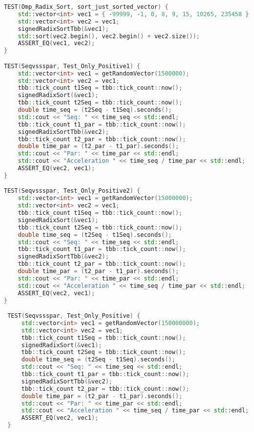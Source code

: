 \documentclass{report}
\begin{document}
\begin{lstlisting}[language=C++]
TEST(Omp_Radix_Sort, sort_just_sorted_vector) {
    std::vector<int> vec1 = { -99999, -1, 0, 8, 9, 15, 10265, 235458 };
    std::vector<int> vec2 = vec1;
    signedRadixSortTbb(&vec1);
    std::sort(vec2.begin(), vec2.begin() + vec2.size());
    ASSERT_EQ(vec1, vec2);
}

TEST(Seqvssspar, Test_Only_Positive1) {
    std::vector<int> vec1 = getRandomVector(1500000);
    std::vector<int> vec2 = vec1;
    tbb::tick_count t1Seq = tbb::tick_count::now();
    signedRadixSort(&vec1);
    tbb::tick_count t2Seq = tbb::tick_count::now();
    double time_seq = (t2Seq - t1Seq).seconds();
    std::cout << "Seq: " << time_seq << std::endl;
    tbb::tick_count t1_par = tbb::tick_count::now();
    signedRadixSortTbb(&vec2);
    tbb::tick_count t2_par = tbb::tick_count::now();
    double time_par = (t2_par - t1_par).seconds();
    std::cout << "Par: " << time_par << std::endl;
    std::cout << "Acceleration " << time_seq / time_par << std::endl;
    ASSERT_EQ(vec2, vec1);
}

TEST(Seqvssspar, Test_Only_Positive2) {
    std::vector<int> vec1 = getRandomVector(15000000);
    std::vector<int> vec2 = vec1;
    tbb::tick_count t1Seq = tbb::tick_count::now();
    signedRadixSort(&vec1);
    tbb::tick_count t2Seq = tbb::tick_count::now();
    double time_seq = (t2Seq - t1Seq).seconds();
    std::cout << "Seq: " << time_seq << std::endl;
    tbb::tick_count t1_par = tbb::tick_count::now();
    signedRadixSortTbb(&vec2);
    tbb::tick_count t2_par = tbb::tick_count::now();
    double time_par = (t2_par - t1_par).seconds();
    std::cout << "Par: " << time_par << std::endl;
    std::cout << "Acceleration " << time_seq / time_par << std::endl;
    ASSERT_EQ(vec2, vec1);
}

 TEST(Seqvssspar, Test_Only_Positive) {
     std::vector<int> vec1 = getRandomVector(150000000);
     std::vector<int> vec2 = vec1;
     tbb::tick_count t1Seq = tbb::tick_count::now();
     signedRadixSort(&vec1);
     tbb::tick_count t2Seq = tbb::tick_count::now();
     double time_seq = (t2Seq - t1Seq).seconds();
     std::cout << "Seq: " << time_seq << std::endl;
     tbb::tick_count t1_par = tbb::tick_count::now();
     signedRadixSortTbb(&vec2);
     tbb::tick_count t2_par = tbb::tick_count::now();
     double time_par = (t2_par - t1_par).seconds();
     std::cout << "Par: " << time_par << std::endl;
     std::cout << "Acceleration " << time_seq / time_par << std::endl;
     ASSERT_EQ(vec2, vec1);
 }

\end{lstlisting}
\end{document}
